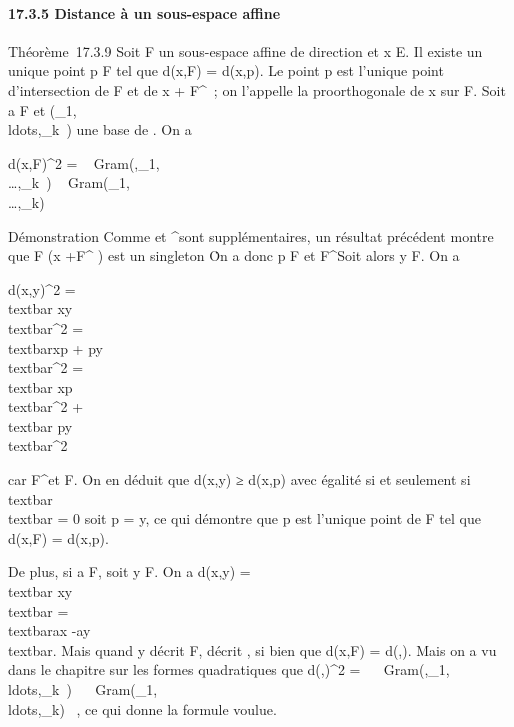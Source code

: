\documentclass[]{article}
\begin{document}
\paragraph{17.3.5 Distance à un sous-espace affine}

Théorème~17.3.9 Soit F un sous-espace affine de direction
\overrightarrowF et x \in E. Il existe un unique point
p \in F tel que d(x,F) = d(x,p). Le point p est l'unique point
d'intersection de F et de x +\overrightarrow
F^\bot~; on l'appelle la pro\jmathection orthogonale de x sur F.
Soit a \in F et
(\vece\_1,\\ldots,\vece\_k~)
une base de \overrightarrowF. On a

d(x,F)^2 =
~
Gram(\overrightarrowax,\vece\_1,\\\ldots,\vece\_k~)
\over
{}~
Gram(\vece\_1,\\\ldots,\vece\_k)~

Démonstration Comme \overrightarrowF et
\overrightarrowF^\bot sont supplémentaires,
un résultat précédent montre que F \bigcap\left (x
+\overrightarrow F^\bot\right
) est un singleton \p\. On a donc p \in
F et \overrightarrowxp
\in\overrightarrow F^\bot Soit alors y \in F. On
a

d(x,y)^2
=\\textbar{}\overrightarrow
xy\\textbar{}^2
=\\textbar{}\overrightarrow xp
+\overrightarrow
py\\textbar{}^2
=\\textbar{}\overrightarrow
xp\\textbar{}^2
+\\textbar{}\overrightarrow
py\\textbar{}^2

car \overrightarrowxp
\in\overrightarrow F^\bot et
\overrightarrowpy \in F. On en déduit que d(x,y) ≥
d(x,p) avec égalité si et seulement
si~\\textbar{}\overrightarrowpy\\textbar{}
= 0 soit p = y, ce qui démontre que p est l'unique point de F tel que
d(x,F) = d(x,p).

De plus, si a \in F, soit y \in F. On a d(x,y)
=\\textbar{}\overrightarrow
xy\\textbar{}
=\\textbar{}\overrightarrow ax
-\overrightarrow ay\\textbar{}. Mais
quand y décrit F, \overrightarroway décrit
\overrightarrowF, si bien que d(x,F) =
d(\overrightarrowax,\overrightarrowF).
Mais on a vu dans le chapitre sur les formes quadratiques que
d(\overrightarrow\xi,\overrightarrowF)^2
= ~
\
Gram(\overrightarrow\xi,\vece\_1,\\ldots,\vece\_k~)
\over
{}~
\
Gram(\vece\_1,\\ldots,\vece\_k)~
, ce qui donne la formule voulue.
\end{document}
